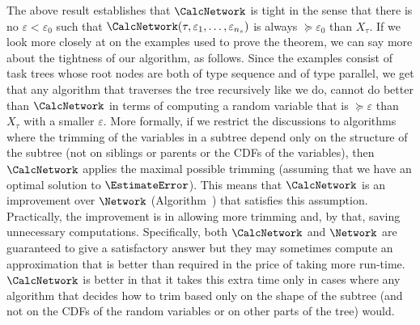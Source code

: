 \documentclass{article}
\begin{document}
The above result establishes that $\CalcNetwork$ is tight in the sense that there is no $\varepsilon < \varepsilon_0$ 
such that $\CalcNetwork(\tau, \varepsilon_1, \dots, \varepsilon_{n_s})$ is always $\succeq{\varepsilon_0}$ than $X_{\tau}$. 
If we look more closely at on the examples used
to prove the theorem, we can say more about the tightness of our algorithm, as follows.
Since the examples consist of task trees whose root nodes are both of
type sequence and of type parallel, we get that any algorithm that traverses the tree
recursively like we do, cannot do better than $\CalcNetwork$ in terms of computing a
random variable that is $\succeq{\varepsilon}$ than $X_{\tau}$ with a smaller $\varepsilon$. 
More formally, if we restrict the discussions to algorithms where the trimming of the variables in a subtree
depend only on the structure of the subtree (not on siblings or parents or the CDFs of the variables), then 
$\CalcNetwork$ applies the maximal possible trimming (assuming that we have an optimal solution to $\EstimateError$). 
This means that $\CalcNetwork$ is an improvement over 
$\Network$ (Algorithm~\label{alg:approx}) that satisfies this assumption. 
Practically, the improvement is in allowing more trimming and, by that, saving unnecessary computations. 
Specifically, both $\CalcNetwork$ and $\Network$ are guaranteed to give a satisfactory answer but they may sometimes compute 
an approximation that is better than required in the price of taking more run-time. $\CalcNetwork$ is better in that it
takes this extra time only in cases where any algorithm that decides how to trim based only on the shape of the subtree 
(and not on the CDFs of the random variables or on other parts of the tree) would.
%
\end{document}

